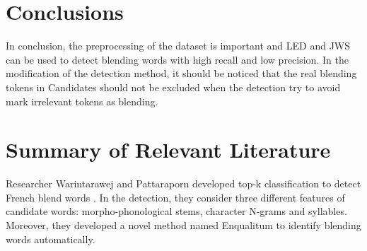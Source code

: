 \documentclass[11pt]{article}
\begin{document}
\section{Conclusions}
In conclusion, the preprocessing of the dataset is important and LED and JWS can be used to detect blending words with high recall and low precision. In the modification of the detection method, it should be noticed that the real blending tokens in Candidates should not be excluded when the detection try to avoid mark irrelevant tokens as blending.

\section{Summary of Relevant Literature}
Researcher Warintarawej and Pattaraporn developed top-k classification to detect French blend words \citep{CooSte10}. In the detection, they consider three different features of candidate words: morpho-phonological stems, character N-grams and syllables. Moreover, they developed a novel method named Enqualitum to identify blending words automatically.

%

\end{document}
